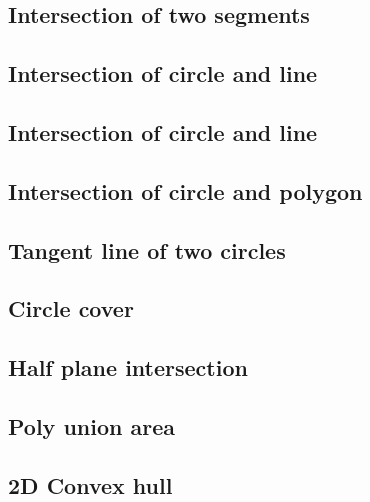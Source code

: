 \documentclass[a4paper,10pt,twocolumn,oneside]{article}
\begin{document}
\subsection{Intersection of two segments}


\subsection{Intersection of circle and line}


\subsection{Intersection of circle and line}


\subsection{Intersection of circle and polygon}


\subsection{Tangent line of two circles}


\subsection{Circle cover}


\subsection{Half plane intersection}


\subsection{Poly union area}


\subsection{2D Convex hull}

\end{document}
